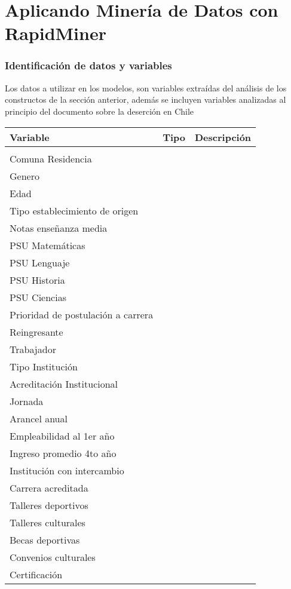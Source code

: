 \chapter[Aplicando Minería de Datos con RapidMiner]{Aplicando Minería de Datos con RapidMiner}
\label{ch:desmin}
\subsection{Identificación de datos y variables}

Los datos a utilizar en los modelos, son variables extraídas del análisis de los constructos de la sección anterior, además se incluyen variables analizadas al principio del documento sobre la deserción en Chile

\begin{table}[H]
	\begin{center}
		\begin{tabular}{|l|l|l|}
			\hline
			Variable & Tipo & Descripción \\
			\hline \hline
			&  & \\ \hline
			Comuna Residencia &  & \\ \hline
			Genero &  & \\ \hline
			Edad &  & \\ \hline
			Tipo establecimiento de origen &  & \\ \hline
			Notas enseñanza media & & \\ \hline
			PSU Matemáticas &  & \\ \hline
			PSU Lenguaje &  & \\ \hline
			PSU Historia &  & \\ \hline
			PSU Ciencias &  & \\ \hline
			Prioridad de postulación a carrera & & \\ \hline
			Reingresante & & \\ \hline
			Trabajador & & \\ \hline
			\hline \hline
			
			Tipo Institución &  & \\ \hline
			Acreditación Institucional &  & \\ \hline
			Jornada &  & \\ \hline
			Arancel anual & & \\ \hline
			Empleabilidad al 1er año & & \\ \hline
			Ingreso promedio 4to año & & \\ \hline
			Institución con intercambio & & \\ \hline
			Carrera acreditada & & \\ \hline
			Talleres deportivos & & \\ \hline
			Talleres culturales & & \\ \hline
			Becas deportivas & & \\ \hline
			Convenios culturales & & \\ \hline
			Certificación & & \\ \hline
			\hline \hline
			

\end{tabular}
\end{center}
\end{table}
